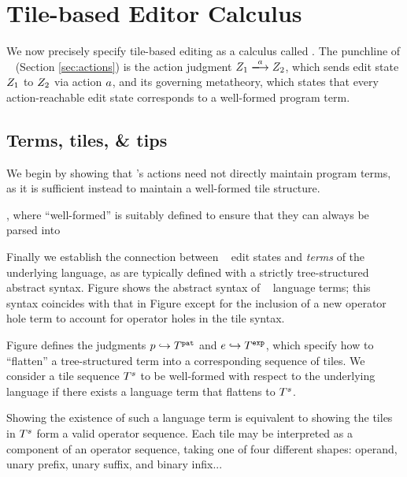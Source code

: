 
\section{Tile-based Editor Calculus}\label{sec:formalism}

We now precisely specify tile-based editing
as a calculus called \ty.
The punchline of \ty~ (Section \ref{sec:actions})
is the action judgment
$\performAction{\editState_1}{\action}{\editState_2}$,
which sends edit state $Z_1$ to $Z_2$
via action $a$, and its governing metatheory,
which states that every action-reachable edit state
corresponds to a well-formed program term.

\subsection{Terms, tiles, \& tips}

We begin by showing that \ty's actions need not
directly maintain program terms, as it is
sufficient instead to maintain a well-formed
tile structure.



, where ``well-formed'' is suitably
defined to ensure that they can always be parsed
into





% 


Finally we establish the connection between
\ty~ edit states and \emph{terms} of the
underlying language, as are typically defined
with a strictly tree-structured abstract syntax.
Figure  shows the abstract syntax of
\ty~ language terms;
this syntax coincides with that in Figure 
except for the inclusion of a new operator hole term
to account for operator holes in the tile syntax.

Figure  defines the judgments
$p\hookrightarrow T^{\texttt{pat}}$
and
$e\hookrightarrow T^{\texttt{exp}}$,
which specify how to ``flatten'' a tree-structured
term into a corresponding sequence of tiles.
We consider a tile sequence $T^s$ to be well-formed
with respect to the underlying language if there exists
a language term that flattens to $T^s$.

Showing the existence of such a language term
is equivalent to showing the tiles in $T^s$
form a valid operator sequence.
Each tile may be interpreted as a component
of an operator sequence, taking one of four
different shapes: operand, unary prefix,
unary suffix, and binary infix...



